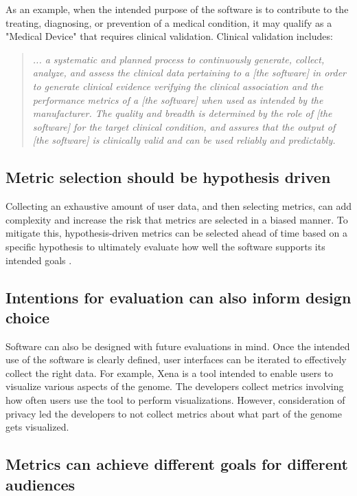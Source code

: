 \documentclass{article}
\begin{document}
As an example, when the intended purpose of the software is to contribute to the treating, diagnosing, or prevention of a medical condition, it may qualify as a "Medical Device" that requires clinical validation. Clinical validation includes:

\begin{quote}
\textit{... a systematic and planned process to continuously generate, collect, analyze, and assess the clinical data pertaining to a [the software] in order to generate clinical evidence verifying the clinical association and the performance metrics of a [the software] when used as intended by the manufacturer. The quality and breadth is determined by the role of [the software] for the target clinical condition, and assures that the output of [the software] is clinically valid and can be used reliably and predictably.}\cite{clinical_evaluation_2017}
\end{quote}

\subsection{Metric selection should be hypothesis driven} 
\label{sec:hypothesis_driven}
Collecting an exhaustive amount of user data, and then selecting metrics, can add complexity and increase the risk that metrics are selected in a biased manner. To mitigate this, hypothesis-driven metrics can be selected ahead of time based on a specific hypothesis to ultimately evaluate how well the software supports its intended goals \cite{design_driven_dev_2020}. 


\subsection{Intentions for evaluation can also inform design choice} Software can also be designed with future evaluations in mind. Once the intended use of the software is clearly defined, user interfaces can be iterated to effectively collect the right data. For example, Xena \cite{xena_2020} is a tool intended to enable users to visualize various aspects of the genome. The developers collect metrics involving how often users use the tool to perform visualizations. However, consideration of privacy led the developers to not collect metrics about what part of the genome gets visualized. 



\subsection{Metrics can achieve different goals for different audiences}
\end{document}
